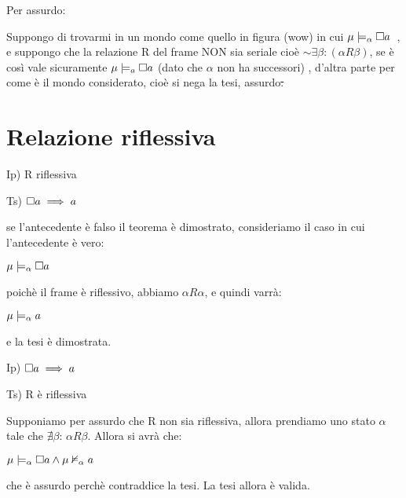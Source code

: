 Per assurdo:

Suppongo di trovarmi in un mondo come quello in figura (wow) in cui
\mbox{$\mu\models_{\alpha}\square a$ }, e suppongo che la relazione
R del frame NON sia seriale cioè $\sim\exists\beta:(\alpha R\beta)$,
se è così vale sicuramente $\mu\models_{a}\square a$ (dato che $\alpha$
non ha successori) , d'altra parte per come è il mondo considerato,
cioè si nega la tesi, assurdo\sout{.}


\section{Relazione riflessiva}

Ip) R riflessiva

Ts) $\square a\implies a$

se l'antecedente è falso il teorema è dimostrato, consideriamo il
caso in cui l'antecedente è vero:

$\mu\models_{\alpha}\square a$

poichè il frame è riflessivo, abbiamo $\alpha R\alpha$, e quindi
varrà:

$\mu\models_{\alpha}a$

e la tesi è dimostrata.

\begin{center} 
 \end{center}

Ip) $\square a\implies a$

Ts) R è riflessiva

Supponiamo per assurdo che R non sia riflessiva, allora prendiamo
uno stato $\alpha$ tale che $\nexists\beta:\,\alpha R\beta$. Allora
si avrà che:

$\mu\models_{\alpha}\square a\wedge\mu\nvDash_{\alpha}a$

che è assurdo perchè contraddice la tesi. La tesi allora è valida.

\begin{center} 
\end{center}



